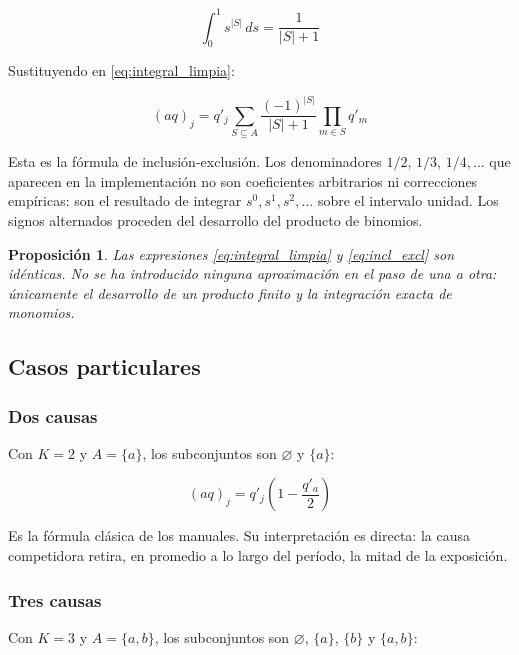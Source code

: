 \documentclass[a4paper, 12pt]{article}
\newtheorem{proposicion}{Proposición}
\begin{document}
\begin{equation}
\int_0^1 s^{|S|}\, ds = \frac{1}{|S|+1}
\end{equation}

Sustituyendo en \eqref{eq:integral_limpia}:

\begin{equation}
\boxed{\;(aq)_j = q'_j \sum_{S \subseteq A} \frac{(-1)^{|S|}}{|S|+1} \prod_{m \in S} q'_m\;}
\label{eq:incl_excl}
\end{equation}

Esta es la fórmula de inclusión-exclusión. Los denominadores $1/2$, $1/3$, $1/4,\dots$ que aparecen en la implementación no son coeficientes arbitrarios ni correcciones empíricas: son el resultado de integrar $s^0, s^1, s^2, \dots$ sobre el intervalo unidad. Los signos alternados proceden del desarrollo del producto de binomios.

\begin{proposicion}
Las expresiones \eqref{eq:integral_limpia} y \eqref{eq:incl_excl} son idénticas. No se ha introducido ninguna aproximación en el paso de una a otra: únicamente el desarrollo de un producto finito y la integración exacta de monomios.
\end{proposicion}

\subsection{Casos particulares}

\subsubsection*{Dos causas}

Con $K=2$ y $A=\{a\}$, los subconjuntos son $\varnothing$ y $\{a\}$:

\begin{equation}
(aq)_j = q'_j \left(1 - \frac{q'_a}{2}\right)
\end{equation}

Es la fórmula clásica de los manuales. Su interpretación es directa: la causa competidora retira, en promedio a lo largo del período, la mitad de la exposición.

\subsubsection*{Tres causas}

Con $K=3$ y $A=\{a,b\}$, los subconjuntos son $\varnothing$, $\{a\}$, $\{b\}$ y $\{a,b\}$:
\end{document}
